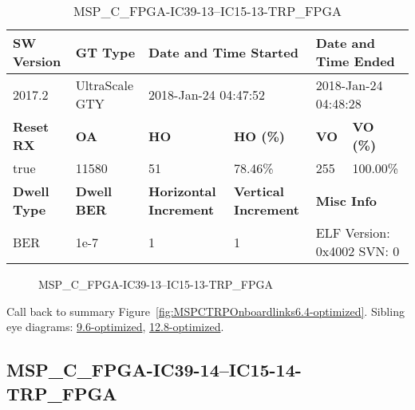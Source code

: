 \begin{table}[h]
\centering
\caption{MSP\_C\_FPGA-IC39-13--IC15-13-TRP\_FPGA}
\label{tab:MSPCFPGAIC3913IC1513TRPFPGA6.4-optimized}
\begin{tabular}{@{}|l|l|l|l|l|l|@{}}
\toprule
\textbf{SW Version}                & \textbf{GT Type}   & \multicolumn{2}{l|}{\textbf{Date and Time Started}}            & \multicolumn{2}{l|}{\textbf{Date and Time Ended}}        \\ \midrule
2017.2                       & UltraScale GTY          & \multicolumn{2}{l|}{2018-Jan-24 04:47:52}                   & \multicolumn{2}{l|}{2018-Jan-24 04:48:28}               \\ \midrule
\textbf{Reset RX}                  & \textbf{OA} & \textbf{HO}   & \textbf{HO (\%)} & \textbf{VO} & \textbf{VO (\%)} \\ \midrule
true & 11580        & 51          & 78.46\%        & 255        & 100.00\%       \\ \midrule
\textbf{Dwell Type}                & \textbf{Dwell BER} & \textbf{Horizontal Increment} & \textbf{Vertical Increment}    & \multicolumn{2}{l|}{\textbf{Misc Info}}                  \\ \midrule
BER                            & 1e-7        & 1        & 1           & \multicolumn{2}{l|}{ELF Version: 0x4002 SVN: 0}                         \\ \bottomrule
\end{tabular}
\end{table}

\begin{figure}[h]
\caption{MSP\_C\_FPGA-IC39-13--IC15-13-TRP\_FPGA} \label{fig:MSPCFPGAIC3913IC1513TRPFPGA6.4-optimized}
\end{figure}

Call back to summary Figure~\ref{fig:MSPCTRPOnboardlinks6.4-optimized}.
Sibling eye diagrams: \hyperref[sec:MSPCFPGAIC3913IC1513TRPFPGA9.6-optimized]{9.6-optimized}, \hyperref[sec:MSPCFPGAIC3913IC1513TRPFPGA12.8-optimized]{12.8-optimized}.

\clearpage
\newpage


\subsection{MSP\_C\_FPGA-IC39-14--IC15-14-TRP\_FPGA}\label{sec:MSPCFPGAIC3914IC1514TRPFPGA6.4-optimized}

